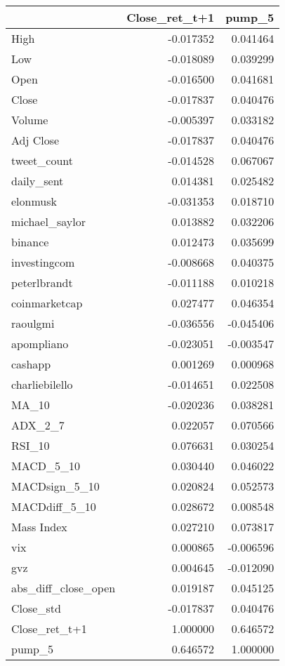 \begin{tabular}{lrr}
\toprule
{} &  Close\_ret\_t+1 &    pump\_5 \\
\midrule
High                &      -0.017352 &  0.041464 \\
Low                 &      -0.018089 &  0.039299 \\
Open                &      -0.016500 &  0.041681 \\
Close               &      -0.017837 &  0.040476 \\
Volume              &      -0.005397 &  0.033182 \\
Adj Close           &      -0.017837 &  0.040476 \\
tweet\_count         &      -0.014528 &  0.067067 \\
daily\_sent          &       0.014381 &  0.025482 \\
elonmusk            &      -0.031353 &  0.018710 \\
michael\_saylor      &       0.013882 &  0.032206 \\
binance             &       0.012473 &  0.035699 \\
investingcom        &      -0.008668 &  0.040375 \\
peterlbrandt        &      -0.011188 &  0.010218 \\
coinmarketcap       &       0.027477 &  0.046354 \\
raoulgmi            &      -0.036556 & -0.045406 \\
apompliano          &      -0.023051 & -0.003547 \\
cashapp             &       0.001269 &  0.000968 \\
charliebilello      &      -0.014651 &  0.022508 \\
MA\_10               &      -0.020236 &  0.038281 \\
ADX\_2\_7             &       0.022057 &  0.070566 \\
RSI\_10              &       0.076631 &  0.030254 \\
MACD\_5\_10           &       0.030440 &  0.046022 \\
MACDsign\_5\_10       &       0.020824 &  0.052573 \\
MACDdiff\_5\_10       &       0.028672 &  0.008548 \\
Mass Index          &       0.027210 &  0.073817 \\
vix                 &       0.000865 & -0.006596 \\
gvz                 &       0.004645 & -0.012090 \\
abs\_diff\_close\_open &       0.019187 &  0.045125 \\
Close\_std           &      -0.017837 &  0.040476 \\
Close\_ret\_t+1       &       1.000000 &  0.646572 \\
pump\_5              &       0.646572 &  1.000000 \\
\bottomrule
\end{tabular}
